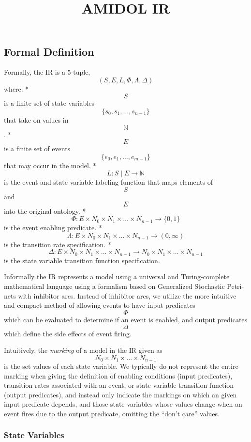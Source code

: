 \documentclass[]{article}
\title{AMIDOL IR}
\date{}
\begin{document}
\maketitle

{
\setcounter{tocdepth}{3}
\tableofcontents
}
\subsection{Formal Definition}\label{formal-definition}

Formally, the IR is a 5-tuple, \[(S, E, L, \Phi, \Lambda, \Delta)\]
where: * \[S\] is a finite set of state variables
\[\{s_0, s_1, \ldots, s_{n-1}\}\] that take on values in \[\mathbb{N}\].
* \[E\] is a finite set of events \[\{e_0, e_1, \ldots, e_{m-1}\}\] that
may occur in the model. * \[L: S \mid E \rightarrow \mathbb{N}\] is the
event and state variable labeling function that maps elements of \[S\]
and \[E\] into the original ontology. *
\[\Phi: E \times N_0 \times N_1 \times \ldots \times N_{n-1} \rightarrow \{0, 1\}\]
is the event enabling predicate. *
\[\Lambda: E \times N_0 \times N_1 \times \ldots \times N_{n-1} \rightarrow (0, \infty)\]
is the transition rate specification. *
\[\Delta: E \times N_0 \times N_1 \times \ldots \times N_{n-1} \rightarrow N_0 \times N_1 \times \ldots \times N_{n-1}\]
is the state variable transition function specification.

Informally the IR represents a model using a universal and
Turing-complete mathematical language using a formalism based on
Generalized Stochastic Petri-nets with inhibitor arcs. Instead of
inhibitor arcs, we utilize the more intuitive and compact method of
allowing events to have input predicates \[\Phi\] which can be evaluated
to determine if an event is enabled, and output predicates \[\Delta\]
which define the side effects of event firing.

Intuitively, the \emph{marking} of a model in the IR given as
\[N_0 \times N_1 \times \ldots \times N_{n-1}\] is the set values of
each state variable. We typically do not represent the entire marking
when giving the definition of enabling conditions (input predicates),
transition rates associated with an event, or state variable transition
function (output predicates), and instead only indicate the markings on
which an given input predicate depends, and those state variables whose
values change when an event fires due to the output predicate, omitting
the ``don't care'' values.

\subsubsection{State Variables}\label{state-variables}
\end{document}
